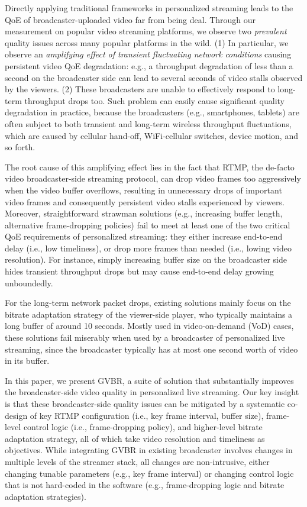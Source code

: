 Directly applying traditional frameworks in personalized streaming leads to the QoE of broadcaster-uploaded video far from being deal. Through our measurement on popular video streaming platforms, we observe two {\em prevalent} quality issues across many popular platforms in the wild.  (1) In particular, we observe an 
{\em amplifying effect of transient fluctuating network conditions} causing persistent video QoE degradation: e.g., a throughput degradation of less than a second on the broadcaster side can lead to several seconds of video stalls observed by the viewers. (2)  These broadcasters are unable to effectively respond to long-term throughput drops too. 
Such problem can easily cause significant quality degradation in practice, because the broadcasters (e.g., smartphones, tablets) are often subject to both transient and long-term wireless throughput fluctuations, which are caused by cellular hand-off, 
WiFi-cellular switches, device motion, and so forth.


The root cause of this amplifying effect lies in the fact that RTMP, 
the de-facto video broadcaster-side streaming protocol, can drop video frames too aggressively when the video buffer overflows, resulting in unnecessary drops of important video frames and consequently persistent video stalls experienced by viewers.
Moreover, straightforward strawman solutions (e.g., increasing
buffer length, alternative frame-dropping policies) fail to meet at least one of the two critical QoE requirements of personalized streaming: they either increase end-to-end delay (i.e., low timeliness), or drop more frames than needed (i.e., lowing video resolution).
For instance, simply increasing buffer size on the broadcaster
side hides transient throughput drops but may cause end-to-end
delay growing unboundedly.

For the long-term network packet drops, existing solutions mainly focus on the bitrate adaptation strategy of the viewer-side player, who typically maintains a long buffer of around 10 seconds. Mostly used in video-on-demand (VoD) cases,
these solutions fail miserably when used by a broadcaster of personalized live streaming, since the broadcaster typically has at most one second worth of video in its buffer. 

In this paper, we present GVBR, a suite of solution that substantially improves
the broadcaster-side video quality in personalized live streaming.
Our key insight is that these broadcaster-side quality issues can be mitigated 
by a systematic co-design of key RTMP configuration (i.e., key frame
interval, buffer size), frame-level control logic (i.e., frame-dropping policy), 
and higher-level bitrate adaptation strategy, all of which take
video resolution and timeliness as objectives. 
While integrating GVBR in existing broadcaster involves changes in multiple
levels of the streamer stack, all changes are non-intrusive, either changing 
tunable parameters (e.g., key frame interval) or changing control logic that
is not hard-coded in the software (e.g., frame-dropping logic and bitrate 
adaptation strategies). 



